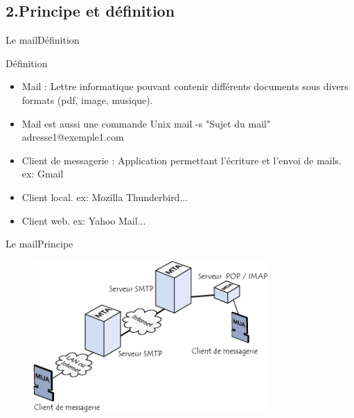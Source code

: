 \documentclass{beamer}
\begin{document}
\subsection{2.Principe et définition}
\begin{frame}{Le mail}{Définition}
    \begin{block}{Définition}
        \begin{itemize}
            \item<1-> {
                Mail : Lettre informatique pouvant contenir différents documents sous divers formats    (pdf, image, musique).
                    }
             \item<2-> {
                Mail est aussi une commande Unix \newline
                mail -s "Sujet du mail" adresse1@exemple1.com
                }
            \item<3-> {
                Client de messagerie : Application permettant l'écriture et l'envoi de mails.\newline
                ex: Gmail}
            \item<4-> {
                Client local.\newline
                ex: Mozilla Thunderbird...}
            \item<5->{
                Client web.
                ex: Yahoo Mail...
                }
      \end{itemize}
    \end{block}
\end{frame}
\begin{frame}{Le mail}{Principe}
    \begin{figure}[h]
        \includegraphics[width=0.80\textwidth, ]{mailT} 
        \caption{} 
        \label{fig:mesh2}
    \end{figure}
\end{frame}
\end{document}
